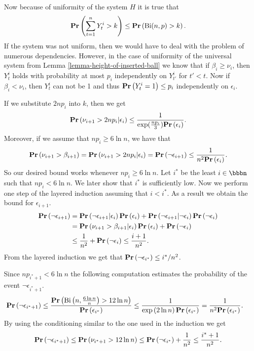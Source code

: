 Now because of uniformity of the system $H$ it is true that $$\mathbf{Pr}\left(\sum_{t = 1}^{n} Y_t^i > k\right) \leq \mathbf{Pr}\left(\mathrm{Bi}(n, p) > k\right).$$ If the system was not uniform, then we would have to deal with the problem of numerous dependencies. However, in the case of uniformity of the universal system from Lemma \ref{lemma-height-of-inserted-ball} we know that if $\beta_i \geq \nu_i$, then $Y_t^i$ holds with probability at most $p_i$ independently on $Y_{t'}^i$ for $t' < t$. Now if $\beta_i < \nu_i$, then $Y_t^i$ can not be 1 and thus $\mathbf{Pr}\left(Y_t^i = 1\right) \leq p_i$ independently on $\epsilon_i$.

If we substitute $2np_i$ into $k$, then we get
\[
\mathbf{Pr}\left(\nu_{i + 1} > 2np_i | \epsilon_i\right) \leq \frac{1}{\exp(\frac{np_i}{3})\mathbf{Pr}\left(\epsilon_i\right)}.
\]
Moreover, if we assume that $np_i \geq 6 \ln n$, we have that 
\[
\mathbf{Pr}\left(\nu_{i + 1} > \beta_{i + 1}\right) = \mathbf{Pr}\left(\nu_{i + 1} > 2np_i | \epsilon_i\right) = \mathbf{Pr}\left(\neg \epsilon_{i + 1}\right) \leq \frac{1}{n ^ 2\mathbf{Pr}\left(\epsilon_i\right)} \textit{.}
\]
So our desired bound works whenever $np_i \geq 6 \ln n$. Let $i^*$ be the least $i \in \bbbn$ such that $np_i < 6 \ln n$. We later show that $i^*$ is sufficiently low. Now we perform one step of the layered induction assuming that $i<i^*$. As a result we obtain the bound for $\epsilon_{i + 1}$.
\[
\begin{split}
\mathbf{Pr}\left(\neg \epsilon_{i + 1}\right) 
	& = \mathbf{Pr}\left(\neg \epsilon_{i + 1} | \epsilon_i\right)\mathbf{Pr}\left(\epsilon_i\right) + \mathbf{Pr}\left(\neg \epsilon_{i + 1} | \neg \epsilon_i\right)\mathbf{Pr}\left(\neg \epsilon_i\right) \\
	& = \mathbf{Pr}\left(\nu_{i + 1} > \beta_{i + 1} | \epsilon_i\right)\mathbf{Pr}\left(\epsilon_i\right) + \mathbf{Pr}\left(\neg \epsilon_i\right) \\
	& \leq \frac{1}{n ^ 2} + \mathbf{Pr}\left(\neg \epsilon_i\right) \leq \frac{i + 1}{n ^ 2} \textit{.}
\end{split} 
\]
From the layered induction we get that $\mathbf{Pr}\left(\neg \epsilon_{i^*}\right) \leq i^* / n^2$. 

Since $np_{i^* + 1} < 6 \ln n$ the following computation estimates the probability of the event $\neg \epsilon_{i^* + 1}$. 
\[
\begin{split}
\mathbf{Pr}\left(\neg \epsilon_{i^* + 1}\right)
	\leq \frac{\mathbf{Pr}\left(\mathrm{Bi}\left(n, \frac{6 \ln n}{n}\right) > 12 \ln n\right)}{\mathbf{Pr}\left(\epsilon_{i^*}\right)} 
	& \leq \frac{1}{\exp\left(2 \ln n\right)\mathbf{Pr}\left(\epsilon_{i^*}\right)} = \frac{1}{n ^ 2 \mathbf{Pr}\left(\epsilon_{i^*}\right)} \textit{.}
\end{split}
\]
By using the conditioning similar to the one used in the induction we get
\[
\mathbf{Pr}\left(\neg \epsilon_{i^* + 1}\right) \leq \mathbf{Pr}\left(\nu_{i^* + 1} > 12 \ln n\right) \leq \mathbf{Pr}\left(\neg \epsilon_{i^*}\right) + \frac{1}{n ^ 2} \leq \frac{i^* + 1}{n ^ 2} \textit{.}
\]

